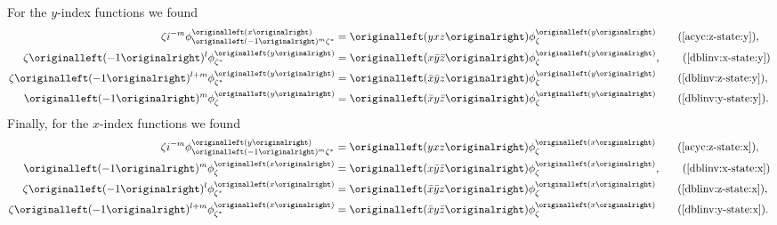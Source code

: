 For the $y$-index functions we found
\begin{align}
  \zeta\im^{-m}
  \phi_{ \left(-1\right)^{m}\zeta^{*} }^{\left(x\right)}
  & =
    \left(yxz\right)
    \phi_{ \zeta }^{\left(y\right)}
\tag{\ref{acyc:z-state:y}}
,\\
  \zeta\left(-1\right)^{l}
  \phi_{ \zeta^{*} }^{\left(y\right)}
  & =
    \left(x\bar{y}\bar{z}\right)
    \phi_{ \zeta }^{\left(y\right)},
\tag{\ref{dblinv:x-state:y}}
\\
  \zeta\left(-1\right)^{l+m}
  \phi_{ \zeta^{*} }^{\left(y\right)}
  & =
    \left(\bar{x}\bar{y}z\right)
    \phi_{ \zeta }^{\left(y\right)}
\tag{\ref{dblinv:z-state:y}}
,\\
  \left(-1\right)^{m}
  \phi_{ \zeta }^{\left(y\right)}
  & =
      \left(\bar{x}y\bar{z}\right)
      \phi_{ \zeta }^{\left(y\right)}
\tag{\ref{dblinv:y-state:y}}
.
\end{align}
Finally, for the $x$-index functions we found
\begin{align}
\zeta\im^{-m}
\phi_{ \left(-1\right)^{m}\zeta^{*} }^{\left(y\right)}
  & =
    \left(yxz\right)
    \phi_{ \zeta }^{\left(x\right)}
\tag{\ref{acyc:z-state:x}}
,\\
\left(-1\right)^{m}
\phi_{ \zeta }^{\left(x\right)}
  & =
    \left(x\bar{y}\bar{z}\right)
    \phi_{ \zeta }^{\left(x\right)},
\tag{\ref{dblinv:x-state:x}}
\\
\zeta\left(-1\right)^{l}
\phi_{ \zeta^{*} }^{\left(x\right)}
  & =
    \left(\bar{x}\bar{y}z\right)
    \phi_{ \zeta }^{\left(x\right)}
\tag{\ref{dblinv:z-state:x}}
,\\
\zeta\left(-1\right)^{l+m}
\phi_{ \zeta^{*} }^{\left(x\right)}
  & =
    \left(\bar{x}y\bar{z}\right)
    \phi_{ \zeta }^{\left(x\right)}
\tag{\ref{dblinv:y-state:x}}
.
\end{align}

